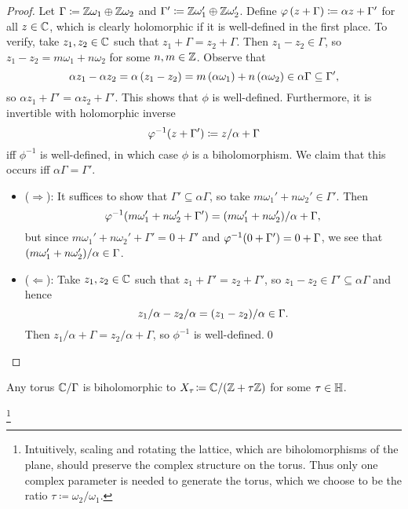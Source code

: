 \documentclass[../Moduli_Spaces_of_Riemann_Surfaces.tex]{subfiles}
\begin{document}
    \begin{proof}
        Let $\Gamma\coloneqq\mathbb{Z}\omega_1\oplus\mathbb{Z}\omega_2$ and $\Gamma'\coloneqq\mathbb{Z}\omega_1'\oplus\mathbb{Z}\omega_2'$. Define $\varphi\left(z+\Gamma\right)\coloneqq\alpha z+\Gamma'$ for all $z\in\mathbb{C}$, which is clearly holomorphic if it is well-defined in the first place. To verify, take $z_1,z_2\in\mathbb{C}$ such that $z_1+\Gamma=z_2+\Gamma$. Then $z_1-z_2\in\Gamma$, so $z_1-z_2=m\omega_1+n\omega_2$ for some $n,m\in\mathbb{Z}$. Observe that
        \begin{equation*}
            \alpha z_1-\alpha z_2=\alpha\left(z_1-z_2\right)=m\left(\alpha\omega_1\right)+n\left(\alpha\omega_2\right)\in\alpha\Gamma\subseteq\Gamma',
        \end{equation*}
        so $\alpha z_1+\Gamma'=\alpha z_2+\Gamma'$. This shows that $\phi$ is well-defined. Furthermore, it is invertible with holomorphic inverse
        \begin{equation*}
            \varphi^{-1}\!\left(z+\Gamma'\right)\coloneqq z/\alpha+\Gamma
        \end{equation*}
        iff $\phi^{-1}$ is well-defined, in which case $\phi$ is a biholomorphism. We claim that this occurs iff $\alpha\Gamma=\Gamma'$.
        \begin{itemize}
            \item ($\Rightarrow$): It suffices to show that $\Gamma'\subseteq\alpha\Gamma$, so take $m\omega_1'+n\omega_2'\in\Gamma'$. Then
                \begin{equation*}
                    \varphi^{-1}\!\left(m\omega_1'+n\omega_2'+\Gamma'\right)=\left(m\omega_1'+n\omega_2'\right)\!/\alpha+\Gamma,
                \end{equation*}
                but since $m\omega_1'+n\omega_2'+\Gamma'=0+\Gamma'$ and $\varphi^{-1}\!\left(0+\Gamma'\right)=0+\Gamma$, we see that $\left(m\omega_1'+n\omega_2'\right)\!/\alpha\in\Gamma$.
            \item ($\Leftarrow$): Take $z_1,z_2\in\mathbb{C}$ such that $z_1+\Gamma'=z_2+\Gamma'$, so $z_1-z_2\in\Gamma'\subseteq\alpha\Gamma$ and hence
                \begin{equation*}
                    z_1/\alpha-z_2/\alpha=\left(z_1-z_2\right)\!/\alpha\in\Gamma.
                \end{equation*}
                Then $z_1/\alpha+\Gamma=z_2/\alpha+\Gamma$, so $\phi^{-1}$ is well-defined.\qed
        \end{itemize}
    \end{proof}
    \begin{lemma}
        Any torus $\mathbb{C}/\Gamma$ is biholomorphic to $X_\tau\!\coloneqq\mathbb{C}/\!\left(\mathbb{Z}+\tau\mathbb{Z}\right)$ for some $\tau\in\mathbb{H}$.
    \end{lemma}\footnote{Intuitively, scaling and rotating the lattice, which are biholomorphisms of the plane, should preserve the complex structure on the torus. Thus only one complex parameter is needed to generate the torus, which we choose to be the ratio $\tau\coloneqq\omega_2/\omega_1$.}\vspace{-0.08in}
\end{document}
